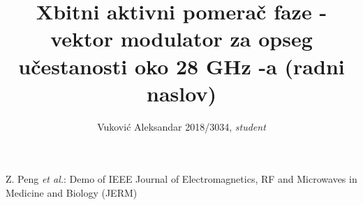 \documentclass[journal,twocolumn,letterpaper]{IEEEJERM}
\begin{document}
%
\title{Xbitni aktivni pomerač faze - vektor modulator za opseg učestanosti oko 28 GHz -a (radni naslov)}

%
\author{Vuković Aleksandar 2018/3034, \textit{student} %
}%

{Z. Peng \MakeLowercase{\textit{et al.}}: Demo of IEEE Journal of Electromagnetics, RF and Microwaves in Medicine and Biology (JERM)}






\end{document}
